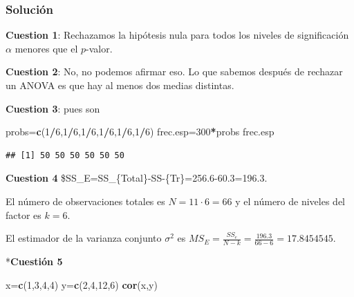 \documentclass[
]{article}
\newenvironment{Shaded}{\begin{snugshade}}{\end{snugshade}}
\newcommand{\DecValTok}[1]{\textcolor[rgb]{0.00,0.00,0.81}{#1}}
\newcommand{\KeywordTok}[1]{\textcolor[rgb]{0.13,0.29,0.53}{\textbf{#1}}}
\newcommand{\NormalTok}[1]{#1}
\newcommand{\OperatorTok}[1]{\textcolor[rgb]{0.81,0.36,0.00}{\textbf{#1}}}
\begin{document}
\hypertarget{soluciuxf3n-6}{%
\subsubsection{Solución}\label{soluciuxf3n-6}}

\textbf{Cuestion 1}: Rechazamos la hipótesis nula para todos los niveles
de significación \(\alpha\) menores que el \(p\)-valor.

\textbf{Cuestion 2}: No, no podemos afirmar eso. Lo que sabemos después
de rechazar un ANOVA es que hay al menos dos medias distintas.

\textbf{Cuestion 3}: pues son

\begin{Shaded}
\begin{Highlighting}[]
\NormalTok{probs=}\KeywordTok{c}\NormalTok{(}\DecValTok{1}\OperatorTok{/}\DecValTok{6}\NormalTok{,}\DecValTok{1}\OperatorTok{/}\DecValTok{6}\NormalTok{,}\DecValTok{1}\OperatorTok{/}\DecValTok{6}\NormalTok{,}\DecValTok{1}\OperatorTok{/}\DecValTok{6}\NormalTok{,}\DecValTok{1}\OperatorTok{/}\DecValTok{6}\NormalTok{,}\DecValTok{1}\OperatorTok{/}\DecValTok{6}\NormalTok{)}
\NormalTok{frec.esp=}\DecValTok{300}\OperatorTok{*}\NormalTok{probs}
\NormalTok{frec.esp}
\end{Highlighting}
\end{Shaded}

\begin{verbatim}
## [1] 50 50 50 50 50 50
\end{verbatim}

\textbf{Cuestion 4} \$SS\_E=SS\_\{Total\}-SS-\{Tr\}=256.6-60.3=196.3.

El número de observaciones totales es \(N=11\cdot 6=66\) y el número de
niveles del factor es \(k=6\).

El estimador de la varianza conjunto \(\sigma^2\) es
\(MS_E=\frac{SS_e}{N-k}=\frac{196.3}{66-6}=17.8454545.\)

*\textbf{Cuestión 5}

\begin{Shaded}
\begin{Highlighting}[]
\NormalTok{x=}\KeywordTok{c}\NormalTok{(}\DecValTok{1}\NormalTok{,}\DecValTok{3}\NormalTok{,}\DecValTok{4}\NormalTok{,}\DecValTok{4}\NormalTok{)}
\NormalTok{y=}\KeywordTok{c}\NormalTok{(}\DecValTok{2}\NormalTok{,}\DecValTok{4}\NormalTok{,}\DecValTok{12}\NormalTok{,}\DecValTok{6}\NormalTok{)}
\KeywordTok{cor}\NormalTok{(x,y)}
\end{Highlighting}
\end{Shaded}
\end{document}

